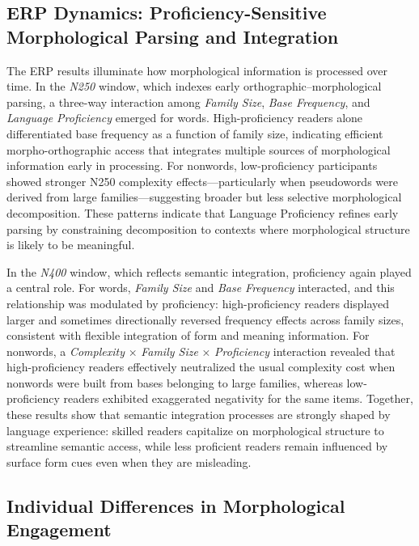 \documentclass[preprint,12pt, authoryear, review]{elsarticle}
\begin{document}
\subsection{ERP Dynamics: Proficiency-Sensitive Morphological Parsing and Integration}

The ERP results illuminate how morphological information is processed over time. In the \textit{N250} window, which indexes early orthographic–morphological parsing, a three-way interaction among \textit{Family Size}, \textit{Base Frequency}, and \textit{Language Proficiency} emerged for words. High-proficiency readers alone differentiated base frequency as a function of family size, indicating efficient morpho-orthographic access that integrates multiple sources of morphological information early in processing. For nonwords, low-proficiency participants showed stronger N250 complexity effects—particularly when pseudowords were derived from large families—suggesting broader but less selective morphological decomposition. These patterns indicate that Language Proficiency refines early parsing by constraining decomposition to contexts where morphological structure is likely to be meaningful.

In the \textit{N400} window, which reflects semantic integration, proficiency again played a central role. For words, \textit{Family Size} and \textit{Base Frequency} interacted, and this relationship was modulated by proficiency: high-proficiency readers displayed larger and sometimes directionally reversed frequency effects across family sizes, consistent with flexible integration of form and meaning information. For nonwords, a \textit{Complexity} × \textit{Family Size} × \textit{Proficiency} interaction revealed that high-proficiency readers effectively neutralized the usual complexity cost when nonwords were built from bases belonging to large families, whereas low-proficiency readers exhibited exaggerated negativity for the same items. Together, these results show that semantic integration processes are strongly shaped by language experience: skilled readers capitalize on morphological structure to streamline semantic access, while less proficient readers remain influenced by surface form cues even when they are misleading.

\subsection{Individual Differences in Morphological Engagement}
\end{document}
